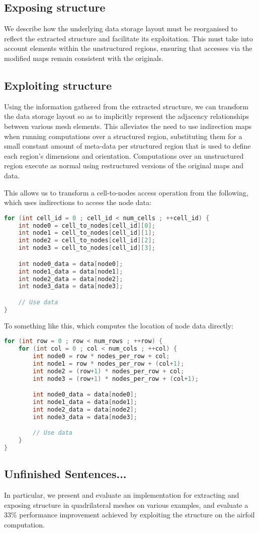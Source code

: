\subsection{Exposing structure}
We describe how the underlying data storage layout must be reorganised to reflect the extracted structure and facilitate its exploitation. This must take into account elements within the unstructured regions, ensuring that accesses via the modified maps remain consistent with the originals.

\subsection{Exploiting structure}
Using the information gathered from the extracted structure, we can transform the data storage layout so as to implicitly represent the adjacency relationships between various mesh elements. This alleviates the need to use indirection maps when running computations over a structured region, substituting them for a small constant amount of meta-data per structured region that is used to define each region's dimensions and orientation. Computations over an unstructured region execute as normal using restructured versions of the original maps and data.

This allows us to transform a cell-to-nodes access operation from the following, which uses indirections to access the node data:
\begin{lstlisting}[language=c++]
for (int cell_id = 0 ; cell_id < num_cells ; ++cell_id) {
	int node0 = cell_to_nodes[cell_id][0];
	int node1 = cell_to_nodes[cell_id][1];
	int node2 = cell_to_nodes[cell_id][2];
	int node3 = cell_to_nodes[cell_id][3];

	int node0_data = data[node0];
	int node1_data = data[node1];
	int node2_data = data[node2];
	int node3_data = data[node3];

	// Use data
}
\end{lstlisting}

To something like this, which computes the location of node data directly:
\begin{lstlisting}[language=c++]
for (int row = 0 ; row < num_rows ; ++row) {
	for (int col = 0 ; col < num_cols ; ++col) {
		int node0 = row * nodes_per_row + col;
		int node1 = row * nodes_per_row + (col+1);
		int node2 = (row+1) * nodes_per_row + col;
		int node3 = (row+1) * nodes_per_row + (col+1);

		int node0_data = data[node0];
		int node1_data = data[node1];
		int node2_data = data[node2];
		int node3_data = data[node3];

		// Use data
	}
}
\end{lstlisting}


\subsection{Unfinished Sentences...}
In particular, we present and evaluate an implementation for extracting and exposing structure in quadrilateral meshes on various examples, and evaluate a 33\% performance improvement achieved by exploiting the structure on the airfoil computation.

